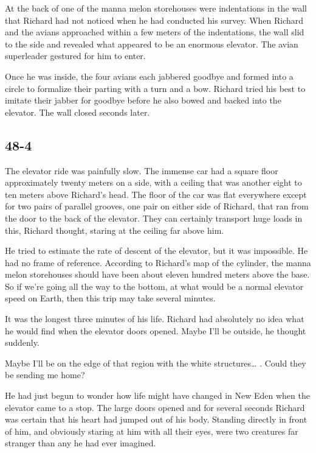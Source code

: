 \documentclass[]{article}
\begin{document}
{At the back of one of the manna melon storehouses were indentations in the wall that Richard had not noticed when he had conducted his survey. When Richard and the avians approached within a few meters of the indentations, the wall slid to the side and revealed what appeared to be an enormous elevator. The avian superleader gestured for him to enter.

Once he was inside, the four avians each jabbered goodbye and formed into a circle to formalize their parting with a turn and a bow. Richard tried his best to imitate their jabber for goodbye before he also bowed and backed into the elevator. The wall closed seconds later.

	
\subsection{48-4}

The elevator ride was painfully slow. The immense car had a square floor approximately twenty meters on a side, with a ceiling that was another eight to ten meters above Richard’s head. The floor of the car was flat everywhere except for two pairs of parallel grooves, one pair on either side of Richard, that ran from the door to the back of the elevator. They can certainly transport huge loads in this, Richard thought, staring at the ceiling far above him.

He tried to estimate the rate of descent of the elevator, but it was impossible. He had no frame of reference. According to Richard’s map of the cylinder, the manna melon storehouses should have been about eleven hundred meters above the base. So if we’re going all the way to the bottom, at what would be a normal elevator speed on Earth, then this trip may take several minutes.

It was the longest three minutes of his life. Richard had absolutely no idea what he would find when the elevator doors opened. Maybe I’ll be outside, he thought suddenly.

Maybe I’ll be on the edge of that region with the white structures… . Could they be sending me home?

He had just begun to wonder how life might have changed in New Eden when the elevator came to a stop. The large doors opened and for several seconds Richard was certain that his heart had jumped out of his body. Standing directly in front of him, and obviously staring at him with all their eyes, were two creatures far stranger than any he had ever imagined.

}
\end{document}
